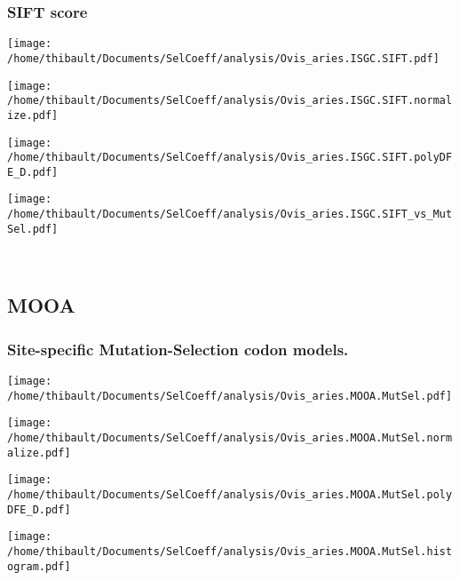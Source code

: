 \subsubsection*{SIFT score} 
\begin{minipage}{0.49\linewidth} 
\texttt{[image: /home/thibault/Documents/SelCoeff/analysis/Ovis\_aries.ISGC.SIFT.pdf]} 
\end{minipage}
\begin{minipage}{0.49\linewidth} 
\texttt{[image: /home/thibault/Documents/SelCoeff/analysis/Ovis\_aries.ISGC.SIFT.normalize.pdf]} 
\end{minipage}
\begin{minipage}{0.49\linewidth} 
\texttt{[image: /home/thibault/Documents/SelCoeff/analysis/Ovis\_aries.ISGC.SIFT.polyDFE\_D.pdf]} 
\end{minipage}
\begin{minipage}{0.49\linewidth} 
\texttt{[image: /home/thibault/Documents/SelCoeff/analysis/Ovis\_aries.ISGC.SIFT\_vs\_MutSel.pdf]} 
\end{minipage}
\\ 
\subsection{MOOA} 
 
\subsubsection*{Site-specific Mutation-Selection codon models.} 
\begin{minipage}{0.49\linewidth} 
\texttt{[image: /home/thibault/Documents/SelCoeff/analysis/Ovis\_aries.MOOA.MutSel.pdf]} 
\end{minipage}
\begin{minipage}{0.49\linewidth} 
\texttt{[image: /home/thibault/Documents/SelCoeff/analysis/Ovis\_aries.MOOA.MutSel.normalize.pdf]} 
\end{minipage}
\begin{minipage}{0.49\linewidth} 
\texttt{[image: /home/thibault/Documents/SelCoeff/analysis/Ovis\_aries.MOOA.MutSel.polyDFE\_D.pdf]} 
\end{minipage}
\begin{minipage}{0.49\linewidth} 
\texttt{[image: /home/thibault/Documents/SelCoeff/analysis/Ovis\_aries.MOOA.MutSel.histogram.pdf]} 
\end{minipage}
\\ 
